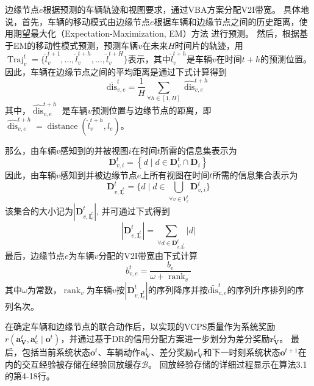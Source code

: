 边缘节点$e$根据预测的车辆轨迹和视图要求，通过VBA方案分配V2I带宽。
具体地说，首先，车辆的移动模式由边缘节点$e$根据车辆和边缘节点之间的历史距离，使用期望最大化（Expectation-Maximization, EM）方法\cite{hofmann2001unsupervised} 进行预测。
然后，根据基于EM的移动性模式预测，预测车辆$v$在未来$H$时间片的轨迹，用$\operatorname{Traj}_{v}^{t} = \{ \hat{l}_{v}^{t+1}, \dots, \hat{l}_{v}^{t+h}, \dots, \hat{l}_{v}^{t+H}\}$表示，其中$\hat{l}_{v}^{t+h}$是车辆$v$在时间$t+h$的预测位置。
因此，车辆在边缘节点之间的平均距离是通过下式计算得到
\begin{equation}
	\operatorname{\bar{dis}}_{v, e}^{t} = \frac{1}{H} {\sum_{\forall h \in [1, H]} \widehat{\operatorname{dis}}_{v, e}^{t+h}}
\end{equation}
其中，$\widehat{\operatorname{dis}}_{v, e}^{t+h}$ 是车辆$v$预测位置与边缘节点的距离，即$\widehat{\operatorname{dis}}_{v, e}^{t+h}=\operatorname{distance}(\hat{l}_{v}^{t+h}, l_{e})$。

那么，由车辆$v$感知到的并被视图$i$在时间$t$所需的信息集表示为 
\begin{equation}
	\mathbf{D}_{v, i}^{t} = \left\{ d \mid  d \in \mathbf{D}_{v}^t \cap  \mathbf{D}_i \right\}
\end{equation}
因此，由车辆$v$感知到并被边缘节点$e$上所有视图在时间$t$所需的信息集合表示为 
\begin{equation}
	\mathbf{D}_{v, {\mathbf{I}_e^t}}^{t} = \{ d \mid  d \in \bigcup_{\forall v \in V_e^t} \mathbf{D}_{v, i}^{t}\}
\end{equation}
\noindent 该集合的大小记为$|\mathbf{D}_{v, {\mathbf{I}_e^t}}^{t}|$, 并可通过下式得到
\begin{equation}
	|\mathbf{D}_{v, {\mathbf{I}_e^t}}^{t}| = \sum_{\forall d \in \mathbf{D}_{v, {\mathbf{I}_e^t}}^{t}}|d|
\end{equation}
最后，边缘节点$e$为车辆$v$分配的V2I带宽由下式计算 
\begin{equation}
	b_{v, e}^{t} =\frac{b_{e}} {\omega+\operatorname{rank}_{v}}
\end{equation}
\noindent 其中$\omega$为常数，$\operatorname{rank}_{v}$为车辆$v$按$| \mathbf{D}_{v, {\mathbf{I}_e^t}}^{t}|$的序列降序并按$\operatorname{\bar{dis}}_{v, e}^{t}$的序列升序排列的序列名次。

在确定车辆和边缘节点的联合动作后，以实现的VCPS质量作为系统奖励$r\left(\boldsymbol{a}_{\mathbf{V}}^{t},\boldsymbol{a}_{e}^{t} \mid \boldsymbol{o}^{t}\right)$，并通过基于DR的信用分配方案进一步划分为差分奖励$\boldsymbol{r}_{\mathbf{V}}^{t}$。
最后，包括当前系统状态$\boldsymbol{o}^{t}$、车辆动作$\boldsymbol{a}_{\mathbf{V}}^{t}$、差分奖励$\boldsymbol{r}_{\mathbf{V}}^{t}$和下一时刻系统状态$\boldsymbol{o}^{t+1}$在内的交互经验被存储在经验回放缓存$\mathcal{B}$。
回放经验存储的详细过程显示在算法3.1的第4-18行。

